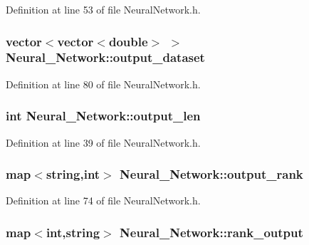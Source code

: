 Definition at line 53 of file Neural\-Network.\-h.

\hypertarget{a00003_aa8441449f55f07c3da384d81608373b5}{
\subsubsection[{output\-\_\-dataset}]{\setlength{\rightskip}{0pt plus 5cm}vector$<$vector$<$double$>$ $>$ Neural\-\_\-\-Network\-::output\-\_\-dataset\hspace{0.3cm}{\ttfamily [private]}}}\label{d1/d7c/a00003_aa8441449f55f07c3da384d81608373b5}


Definition at line 80 of file Neural\-Network.\-h.

\hypertarget{a00003_a053d2b510e07b1f25ef112f366bc62ba}{
\subsubsection[{output\-\_\-len}]{\setlength{\rightskip}{0pt plus 5cm}int Neural\-\_\-\-Network\-::output\-\_\-len\hspace{0.3cm}{\ttfamily [private]}}}\label{d1/d7c/a00003_a053d2b510e07b1f25ef112f366bc62ba}


Definition at line 39 of file Neural\-Network.\-h.

\hypertarget{a00003_af46a9de8ef619f93fb8c0231be79163c}{
\subsubsection[{output\-\_\-rank}]{\setlength{\rightskip}{0pt plus 5cm}map$<$string,int$>$ Neural\-\_\-\-Network\-::output\-\_\-rank\hspace{0.3cm}{\ttfamily [private]}}}\label{d1/d7c/a00003_af46a9de8ef619f93fb8c0231be79163c}


Definition at line 74 of file Neural\-Network.\-h.

\hypertarget{a00003_a8e34531b701290d16068e3685f3066a4}{
\subsubsection[{rank\-\_\-output}]{\setlength{\rightskip}{0pt plus 5cm}map$<$int,string$>$ Neural\-\_\-\-Network\-::rank\-\_\-output\hspace{0.3cm}{\ttfamily [private]}}}\label{d1/d7c/a00003_a8e34531b701290d16068e3685f3066a4}


